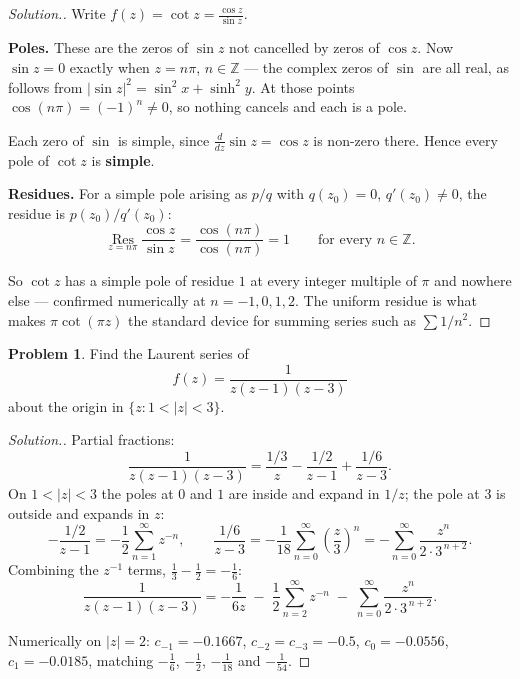 \documentclass[11pt,a4paper]{article}
\theoremstyle{definition}
\newtheorem{problemx}{Problem}[section]
\newenvironment{problem}{\begin{problemx}}{\end{problemx}}
\newenvironment{solution}
  {\renewcommand{\qedsymbol}{}\begin{proof}[\textit{Solution}.]}
  {\end{proof}}
\begin{document}
\begin{solution}
Write $f(z) = \cot z = \frac{\cos z}{\sin z}$.

\textbf{Poles.} These are the zeros of $\sin z$ not cancelled by zeros of
$\cos z$. Now $\sin z = 0$ exactly when $z = n\pi$, $n \in \mathbb{Z}$ --- the
complex zeros of $\sin$ are all real, as follows from
$\left|\sin z\right|^{2} = \sin^{2}x + \sinh^{2}y$. At those points
$\cos(n\pi) = (-1)^{n} \neq 0$, so nothing cancels and each is a pole.

Each zero of $\sin$ is simple, since $\frac{d}{dz}\sin z = \cos z$ is non-zero
there. Hence every pole of $\cot z$ is \textbf{simple}.

\textbf{Residues.} For a simple pole arising as $p/q$ with $q(z_0) = 0$,
$q'(z_0)\neq0$, the residue is $p(z_0)/q'(z_0)$:
$$\operatorname*{Res}_{z=n\pi}\frac{\cos z}{\sin z}
= \frac{\cos(n\pi)}{\cos(n\pi)} = \boxed{1}\qquad\text{for every } n \in \mathbb{Z}.$$

So $\cot z$ has a simple pole of residue $1$ at every integer multiple of $\pi$ and
nowhere else --- confirmed numerically at $n = -1, 0, 1, 2$. The uniform residue is
what makes $\pi\cot(\pi z)$ the standard device for summing series such as
$\sum 1/n^{2}$.
\end{solution}


\begin{problem}
Find the Laurent series of
$$f(z) = \frac{1}{z(z-1)(z-3)}$$
about the origin in $\{z : 1 < \left|z\right| < 3\}$.
\end{problem}

\begin{solution}
Partial fractions:
$$\frac{1}{z(z-1)(z-3)}
= \frac{1/3}{z} - \frac{1/2}{z-1} + \frac{1/6}{z-3}.$$
On $1 < \left|z\right| < 3$ the poles at $0$ and $1$ are inside and expand in
$1/z$; the pole at $3$ is outside and expands in $z$:
$$-\frac{1/2}{z-1} = -\frac{1}{2}\sum^{\infty}_{n=1} z^{-n},
\qquad
\frac{1/6}{z-3} = -\frac{1}{18}\sum^{\infty}_{n=0}\left(\frac z3\right)^{n}
= -\sum^{\infty}_{n=0}\frac{z^{n}}{2\cdot 3^{\,n+2}} .$$
Combining the $z^{-1}$ terms, $\frac13 - \frac12 = -\frac16$:
$$\boxed{\frac{1}{z(z-1)(z-3)}
= -\frac{1}{6z}
\;-\;\frac{1}{2}\sum^{\infty}_{n=2} z^{-n}
\;-\;\sum^{\infty}_{n=0}\frac{z^{n}}{2\cdot 3^{\,n+2}} .}$$

Numerically on $\left|z\right| = 2$: $c_{-1} = -0.1667$, $c_{-2} = c_{-3} = -0.5$,
$c_0 = -0.0556$, $c_1 = -0.0185$, matching $-\frac16$, $-\frac12$, $-\frac1{18}$
and $-\frac1{54}$.
\end{solution}
\end{document}
